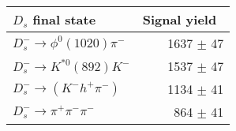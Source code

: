  \begin{tabular}{l r }
\hline\hline
$D_s$ final state  & Signal yield\ \\
\hline
$D_{s}^{-} \to \phi^{0}(1020)\pi^{-}$ & 1637 $\pm$ 47 \\
$D_{s}^{-}\to K^{*0}(892)K^{-}$ & 1537 $\pm$ 47 \\
$D_{s}^{-}\to (K^{-}h^{+}\pi^{-})$ & 1134 $\pm$ 41 \\
$D_{s}^{-}\to \pi^{+}\pi^{-}\pi^{-}$ & 864 $\pm$ 41 \\
\hline\hline
\end{tabular}
\label{table:signalYieldsDs}
